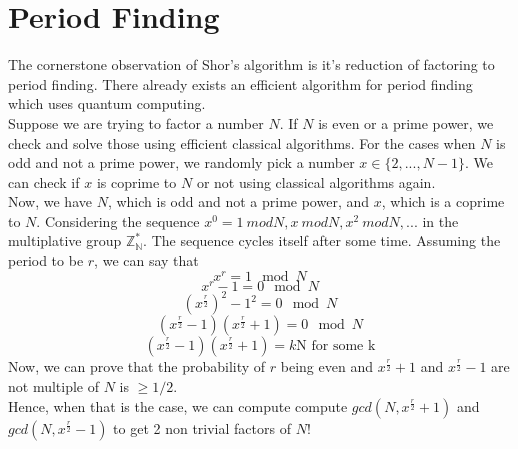 \section{Period Finding}
The cornerstone observation of Shor's algorithm is it's reduction of factoring to period finding. There already exists an efficient algorithm for period finding which uses quantum computing. \\
Suppose we are trying to factor a number $N$. If $N$ is even or a prime power, we check and solve those using efficient classical algorithms. For the cases when $N$ is odd and not a prime power, we randomly pick a number $x \in \{2, ..., N - 1\}$. We can check if $x$ is coprime to $N$ or not using classical algorithms again. \\
Now, we have $N$, which is odd and not a prime power, and $x$, which is a coprime to $N$. Considering the sequence $x^0 = 1\:mod N, x\:mod N, x^2\:mod N, ...$ in the multiplative group $\mathbb{Z^*_{N}}$. The sequence cycles itself after some time. Assuming the period to be $r$, we can say that
\begin{equation*}
    x^r = 1 \mod{N}
\end{equation*}
\begin{equation*}
    x^r - 1 = 0 \mod{N}
\end{equation*}
\begin{equation*}
    (x^\frac{r}{2})^2 - 1^2 = 0 \mod{N}
\end{equation*}
\begin{equation*}
    (x^\frac{r}{2} - 1)(x^\frac{r}{2} + 1) = 0 \mod{N}
\end{equation*}
\begin{equation*}
    (x^\frac{r}{2} - 1)(x^\frac{r}{2} + 1) = k \text{N for some k}
\end{equation*}
Now, we can prove that the probability of $r$ being even and $x^\frac{r}{2} + 1$ and $x^\frac{r}{2} - 1$ are not multiple of $N$ is $\geq 1/2$. \\
Hence, when that is the case, we can compute compute $gcd(N, x^\frac{r}{2} + 1)$ and $gcd(N, x^\frac{r}{2} - 1)$ to get 2 non trivial factors of $N$!

